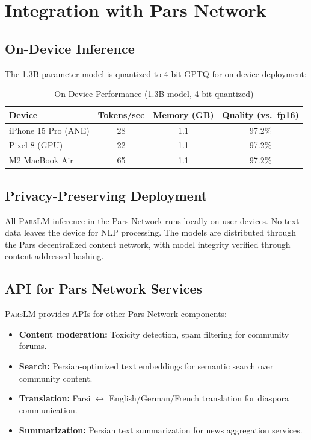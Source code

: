 \documentclass[11pt,a4paper]{article}
\newcommand{\parslm}{\textsc{ParsLM}\xspace}
\begin{document}
\section{Integration with Pars Network}

\subsection{On-Device Inference}

The 1.3B parameter model is quantized to 4-bit GPTQ for on-device deployment:

\begin{table}[H]
\centering
\caption{On-Device Performance (1.3B model, 4-bit quantized)}
\label{tab:device}
\begin{tabular}{lccc}
\toprule
\textbf{Device} & \textbf{Tokens/sec} & \textbf{Memory (GB)} & \textbf{Quality (vs.\ fp16)} \\
\midrule
iPhone 15 Pro (ANE) & 28 & 1.1 & 97.2\% \\
Pixel 8 (GPU) & 22 & 1.1 & 97.2\% \\
M2 MacBook Air & 65 & 1.1 & 97.2\% \\
\bottomrule
\end{tabular}
\end{table}

\subsection{Privacy-Preserving Deployment}

All \parslm inference in the Pars Network runs locally on user devices. No text data leaves the device for NLP processing. The models are distributed through the Pars decentralized content network, with model integrity verified through content-addressed hashing.

\subsection{API for Pars Network Services}

\parslm provides APIs for other Pars Network components:

\begin{itemize}
    \item \textbf{Content moderation:} Toxicity detection, spam filtering for community forums.
    \item \textbf{Search:} Persian-optimized text embeddings for semantic search over community content.
    \item \textbf{Translation:} Farsi $\leftrightarrow$ English/German/French translation for diaspora communication.
    \item \textbf{Summarization:} Persian text summarization for news aggregation services.
\end{itemize}
\end{document}
